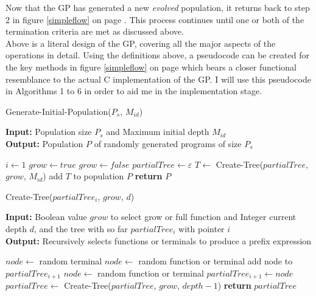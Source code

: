 \documentclass[a4paper,10.5pt]{article}
\begin{document}
Now that the GP has generated a new \emph{evolved} population, it returns back to step 2 in figure \ref{simpleflow} on page \pageref{simpleflow}. This process continues until one or both of the termination criteria are met as discussed above.\\

Above is a literal design of the GP, covering all the major aspects of the operations in detail. Using the definitions above, a pseudocode can be created for the key methods in figure \ref{simpleflow} on page \pageref{simpleflow} which bears a closer functional resemblance to the actual C implementation of the GP. I will use this pseudocode in Algorithms 1 to 6 in order to aid me in the implementation stage.

\begin{algorithm}[H]
  \caption{Generate-Initial-Population($P_{s}$, $M_{id}$)}
  \textbf{Input:} Population size $P_{s}$ and Maximum initial depth $M_{id}$\\
  \textbf{Output:} Population $P$ of randomly generated programs of size $P_s$\\
  \begin{algorithmic}[1]
    \State $i \gets 1$
		\State $grow \gets true$
	\Else
		\State $grow \gets false$
	\EndIf
	\State $partialTree \gets \varepsilon$
	\State $T \gets$ Create-Tree($partialTree$, $grow$, $M_{id}$)
	\State add $T$ to population $P$
    \EndFor	
\State \textbf{return} $P$
  \end{algorithmic}
\end{algorithm}

\begin{algorithm}[H]
  \caption{Create-Tree($partialTree_i$, $grow$, $d$)}
  \textbf{Input:} Boolean value $grow$ to select grow or full function and Integer current depth $d$, and the tree with so far $partialTree_i$ with pointer $i$\\
  \textbf{Output:} Recursively selects functions or terminals to produce a prefix expression\\
  \begin{algorithmic}[1]  
	\State $node \gets $ random terminal
  \Else
		\State $node \gets $ random function or terminal
		\State add node to $partialTree_{i+1}$
	\Else
		\State $node  \gets $ random function or terminal
		\State $partialTree_{i+1} \gets node$
				\State $partialTree \gets $ Create-Tree($partialTree$,  $grow$, $depth-1$)
			\EndFor
		\EndIf
     	\EndIf
  \EndIf  
\State \textbf{return} $partialTree$
  \end{algorithmic}
\end{algorithm}
\end{document}
